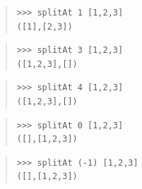 \begin{haddockdesc}
{\begin{quote}
{\begin{verbatim}
\end{verbatim}}
\end{quote}
\begin{quote}
{\haddockverb\begin{verbatim}
>>> splitAt 1 [1,2,3]
([1],[2,3])

\end{verbatim}}
\end{quote}
\begin{quote}
{\haddockverb\begin{verbatim}
>>> splitAt 3 [1,2,3]
([1,2,3],[])

\end{verbatim}}
\end{quote}
\begin{quote}
{\haddockverb\begin{verbatim}
>>> splitAt 4 [1,2,3]
([1,2,3],[])

\end{verbatim}}
\end{quote}
\begin{quote}
{\haddockverb\begin{verbatim}
>>> splitAt 0 [1,2,3]
([],[1,2,3])

\end{verbatim}}
\end{quote}
\begin{quote}
{\haddockverb\begin{verbatim}
>>> splitAt (-1) [1,2,3]
([],[1,2,3])

\end{verbatim}}
\end{quote}}
\end{haddockdesc}
